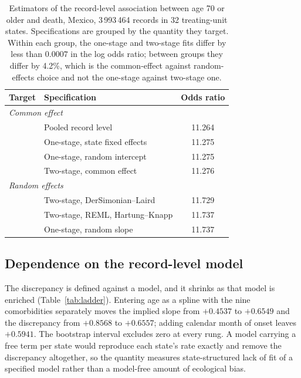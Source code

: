 \documentclass[11pt]{article}
\begin{document}
\begin{table}[t]
\centering
\caption{Estimators of the record-level association between age 70 or
older and death, Mexico, 3\,993\,464 records in 32 treating-unit states.
Specifications are grouped by the quantity they target.  Within each
group, the one-stage and two-stage fits differ by less than $0.0007$ in
the log odds ratio; between groups they differ by 4.2\%, which is the
common-effect against random-effects choice and not the one-stage
against two-stage one.}
\label{tab:estimators}
\begin{tabular}{llc}
\toprule
Target & Specification & Odds ratio \\
\midrule
\multicolumn{3}{l}{\emph{Common effect}} \\
& Pooled record level                  & 11.264 \\
& One-stage, state fixed effects       & 11.275 \\
& One-stage, random intercept          & 11.275 \\
& Two-stage, common effect             & 11.276 \\
\midrule
\multicolumn{3}{l}{\emph{Random effects}} \\
& Two-stage, DerSimonian--Laird        & 11.729 \\
& Two-stage, REML, Hartung--Knapp      & 11.737 \\
& One-stage, random slope              & 11.737 \\
\bottomrule
\end{tabular}
\end{table}

\subsection{Dependence on the record-level model}

The discrepancy is defined against a model, and it shrinks as that model
is enriched (Table~\ref{tab:ladder}).  Entering age as a spline with the
nine comorbidities separately moves the implied slope from $+0.4537$ to
$+0.6549$ and the discrepancy from $+0.8568$ to $+0.6557$; adding
calendar month of onset leaves $+0.5941$.  The bootstrap interval
excludes zero at every rung.  A model carrying a free term per state
would reproduce each state's rate exactly and remove the discrepancy
altogether, so the quantity measures state-structured lack of fit of a
specified model rather than a model-free amount of ecological bias.
\end{document}
